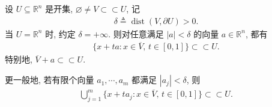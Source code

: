 \documentclass[../../main.tex]{subfiles}
\begin{document}
\begin{proposition}[开集内部小幅平移后仍在原本开集中]\label{proposition:开集内部小幅平移后仍在原本开集中}
设 $U\subseteq\mathbb{R}^n$ 是开集, $\varnothing\neq V\subset\subset U$, 记
\begin{align*}
\delta\triangleq\operatorname{dist}(V,\partial U)>0.
\end{align*}
当 $U=\mathbb{R}^n$ 时, 约定 $\delta=+\infty$.
则对任意满足 $|a|<\delta$ 的向量 $a\in\mathbb{R}^n$, 都有
\begin{align*}
\{x+ta:x\in\overline{V},\, t\in[0,1]\}
\subset\subset U.
\end{align*}
特别地, $\overline{V}+a\subset\subset U$.

更一般地, 若有限个向量 $a_1,\cdots,a_m$ 都满足 $|a_j|<\delta$, 则
\begin{align*}
\bigcup\limits_{j=1}^m
\{x+ta_j:x\in\overline{V},\, t\in[0,1]\}
\subset\subset U.
\end{align*}
\end{proposition}
\end{document}
